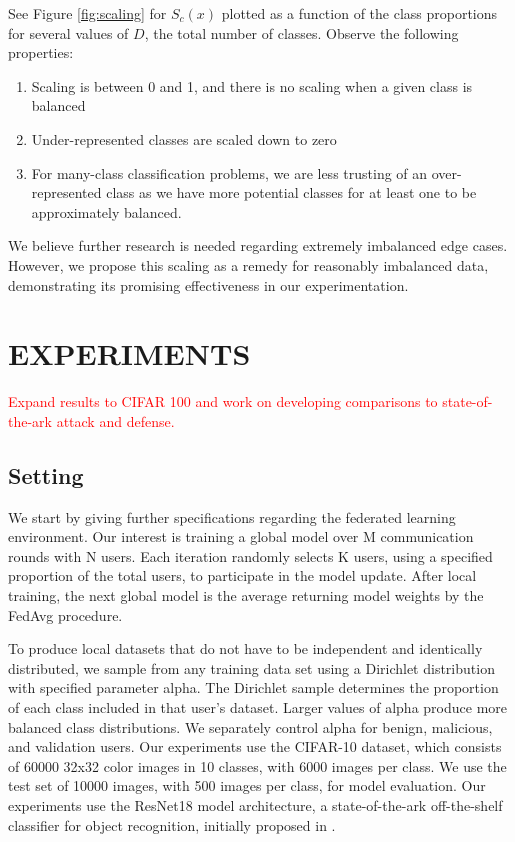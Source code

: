 \documentclass{article} %
\begin{document}
See Figure \ref{fig:scaling} for $S_c(x)$ plotted as a function of the class proportions for several values of $D$, the total number of classes. Observe the following  properties:
\begin{enumerate}
    \item Scaling is between 0 and 1, and there is no scaling when a given class is balanced
    \item Under-represented classes are scaled down to zero
    \item For many-class classification problems, we are less trusting of an over-represented class as we have more potential classes for at least one to be approximately balanced.
\end{enumerate}

We believe further research is needed regarding extremely imbalanced edge cases. However, we propose this scaling as a remedy for reasonably imbalanced data, demonstrating its promising effectiveness in our experimentation.

\section{EXPERIMENTS}

\textcolor{red}{Expand results to CIFAR 100 and work on developing comparisons to state-of-the-ark attack and defense.}

%
\subsection{Setting}

We start by giving further specifications regarding the federated learning environment. Our interest is training a global model over M communication rounds with N users. Each iteration randomly selects K users, using a specified proportion of the total users, to participate in the model update. After local training, the next global model is the average returning model weights by the FedAvg procedure. 

To produce local datasets that do not have to be independent and identically distributed, we sample from any training data set using a Dirichlet distribution with specified parameter alpha. The Dirichlet sample determines the proportion of each class included in that user's dataset. Larger values of alpha produce more balanced class distributions. We separately control alpha for benign, malicious, and validation users. Our experiments use the CIFAR-10 dataset, which consists of 60000 32x32 color images in 10 classes, with 6000 images per class. We use the test set of 10000 images, with 500 images per class, for model evaluation. Our experiments use the ResNet18 model architecture, a state-of-the-ark off-the-shelf classifier for object recognition, initially proposed in \cite{resnet}. 
\end{document}

